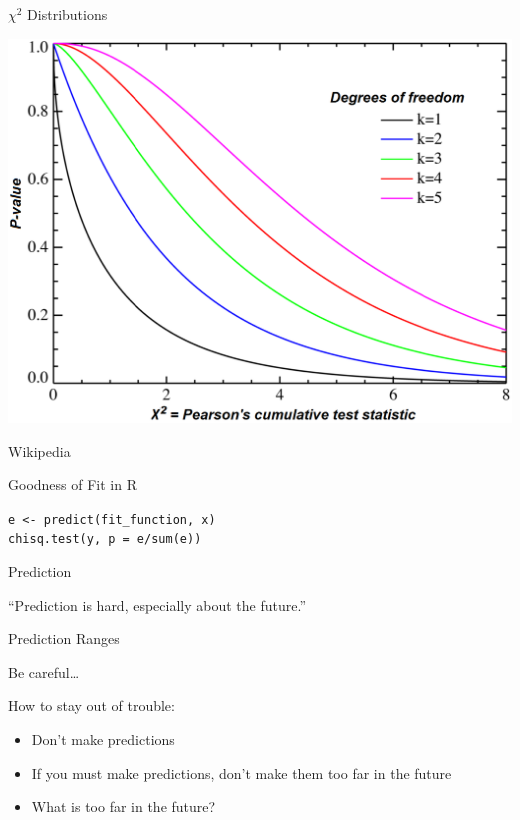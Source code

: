 \documentclass{beamer}
\begin{document}
\begin{frame}{$\chi^{2}$ Distributions}

\begin{center}
\includegraphics[scale=0.25]{pics/wk4/chi2.png}
\end{center}

Wikipedia
\end{frame}


\begin{frame}{Goodness of Fit in R}

\texttt{e <- predict(fit\_function, x)}\\
\texttt{chisq.test(y, p = e/sum(e))}

\end{frame}


\begin{frame}{Prediction}

``Prediction is hard, especially about the future.''

\end{frame}


\begin{frame}{Prediction Ranges}

Be careful\ldots

\vspace{5mm}

How to stay out of trouble:
\begin{itemize}
\item Don't make predictions
\item If you must make predictions, don't make them too far in the future
\item What is too far in the future?
\end{itemize}

\end{frame}
\end{document}
